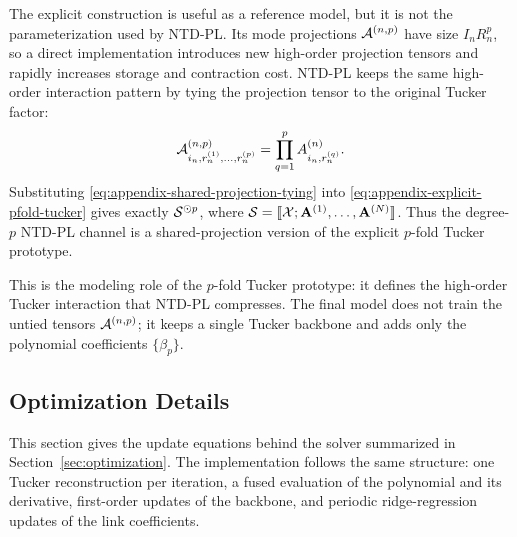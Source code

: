 The explicit construction is useful as a reference model, but it is not the
parameterization used by NTD-PL. Its mode projections
\(\mathcal{A}^{(n,p)}\) have size \(I_nR_n^p\), so a direct implementation introduces
new high-order projection tensors and rapidly increases storage and
contraction cost. NTD-PL keeps the same high-order interaction pattern by
tying the projection tensor to the original Tucker factor:
\begin{equation}
  \mathcal{A}^{(n,p)}_{i_n,r_n^{(1)},\ldots,r_n^{(p)}}
  =
  \prod_{q=1}^{p} A^{(n)}_{i_n,r_n^{(q)}} .
  \label{eq:appendix-shared-projection-tying}
\end{equation}
Substituting \eqref{eq:appendix-shared-projection-tying} into
\eqref{eq:appendix-explicit-pfold-tucker} gives exactly
\(\mathcal{S}^{\odot p}\), where
\(\mathcal{S}=\llbracket \mathcal{X}; \mathbf{A}^{(1)},\ldots,\mathbf{A}^{(N)} \rrbracket\). Thus the degree-\(p\)
NTD-PL channel is a shared-projection version of the explicit \(p\)-fold
Tucker prototype.

This is the modeling role of the \(p\)-fold Tucker prototype: it defines the
high-order Tucker interaction that NTD-PL compresses. The final model does not
train the untied tensors \(\mathcal{A}^{(n,p)}\); it keeps a single Tucker backbone and
adds only the polynomial coefficients \(\{\beta_p\}\).

\subsection{Optimization Details}
\label{app:optimization-details}
\label{app:optimization-algorithm}

This section gives the update equations behind the solver summarized in
Section~\ref{sec:optimization}. The implementation follows the same structure:
one Tucker reconstruction per iteration, a fused evaluation of the polynomial
and its derivative, first-order updates of the backbone, and periodic
ridge-regression updates of the link coefficients.

